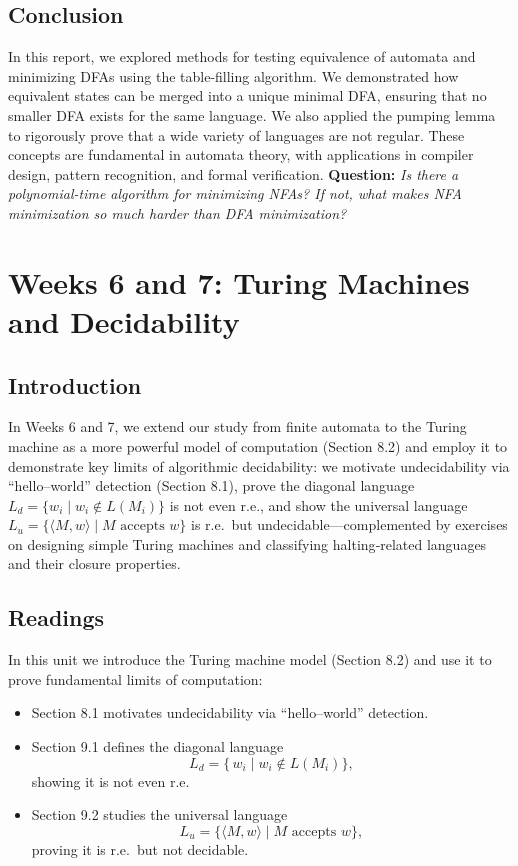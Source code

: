 \documentclass{article}
\theoremstyle{theorem}
\theoremstyle{definition}
\theoremstyle{remark}
\begin{document}
\subsection{Conclusion}
In this report, we explored methods for testing equivalence of automata and minimizing DFAs using the table-filling algorithm. We demonstrated how equivalent states can be merged into a unique minimal DFA, ensuring that no smaller DFA exists for the same language. We also applied the pumping lemma to rigorously prove that a wide variety of languages are not regular. These concepts are fundamental in automata theory, with applications in compiler design, pattern recognition, and formal verification.
\textbf{Question:}  
\emph{Is there a polynomial-time algorithm for minimizing NFAs? If not, what makes NFA minimization so much harder than DFA minimization?}

\newpage

\section{Weeks 6 and 7: Turing Machines and Decidability}

\subsection{Introduction}
In Weeks 6 and 7, we extend our study from finite automata to the Turing machine as a more powerful model of computation (Section 8.2) and employ it to demonstrate key limits of algorithmic decidability: we motivate undecidability via “hello–world” detection (Section 8.1), prove the diagonal language \(L_{d}=\{w_i\mid w_i\notin L(M_i)\}\) is not even r.e., and show the universal language \(L_{u}=\{\langle M,w\rangle\mid M\text{ accepts }w\}\) is r.e.\ but undecidable—complemented by exercises on designing simple Turing machines and classifying halting‐related languages and their closure properties.


\subsection{Readings}

In this unit we introduce the Turing machine model (Section 8.2) and use it to prove fundamental limits of computation:  
\begin{itemize}
  \item Section 8.1 motivates undecidability via “hello–world” detection.  
  \item Section 9.1 defines the diagonal language 
    \[
      L_{d} = \{\,w_i \mid w_i \notin L(M_i)\},
    \]
    showing it is not even r.e.  
  \item Section 9.2 studies the universal language 
    \[
      L_{u} = \{\langle M,w\rangle \mid M\text{ accepts }w\},
    \]
    proving it is r.e.\ but not decidable.  
\end{itemize}
\end{document}
